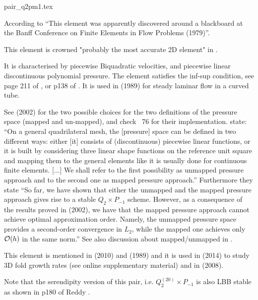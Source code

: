 \begin{flushright} {\tiny {\color{gray} pair\_q2pm1.tex}} \end{flushright}

According to \textcite{bobf08} ``This element was apparently discovered 
around a blackboard at the Banff Conference on Finite Elements in Flow Problems (1979)''.

\begin{center}

\end{center}

This element is crowned "probably the most accurate 2D element" 
in \textcite{grsa}.

It is characterised by piecewise Biquadratic velocities, 
and piecewise linear discontinuous polynomial pressure. 
The element satisfies the inf-sup condition, see page 211 of \textcite{hugh}, or 
p138 of \textcite{elsw}.
It is used in \textcite{vavs89} (1989) for steady laminar flow in a curved tube. 

See \textcite{boga02} (2002) 
for the two possible choices for the two definitions of the pressure space (mapped and un-mapped), 
and check \stone~76 for their implementation.
\textcite{bobf08} state: ``On a general quadrilateral mesh, the [pressure] space 
can be defined in two different ways: either [it] 
consists of (discontinuous) piecewise linear functions, or it is built
by considering three linear shape functions on the reference unit square and mapping
them to the general elements like it is usually done for continuous finite elements. [...]
We shall refer to the first possibility as unmapped pressure approach and to the
second one as mapped pressure approach.''
Furthermore they state ``So far, we have shown that either the unmapped and the mapped pressure 
approach gives rise to a stable $Q_2\times P_{-1}$ scheme. However, as a consequence of the
results proved in \textcite{arbf02} (2002), we have that the mapped pressure approach cannot achieve 
optimal approximation order. Namely, the unmapped pressure space provides a second-order convergence 
in $L_2$, while the mapped one achieves only ${\cal O}(h)$ in the same norm.''
See also discussion about mapped/unmapped in \textcite{bobf13}.

This element is mentioned in \textcite{kaus10} (2010) and \textcite{pefc89} (1989) 
and it is used in \textcite{freh14} (2014) to study 3D fold growth rates 
(see online supplementary material) and in \textcite{schm08} (2008).

Note that the serendipity version of this pair, i.e. $Q_2^{(20)}\times P_{-1}$ is also LBB stable
as shown in p180 of Reddy \cite{reddybook2}.





